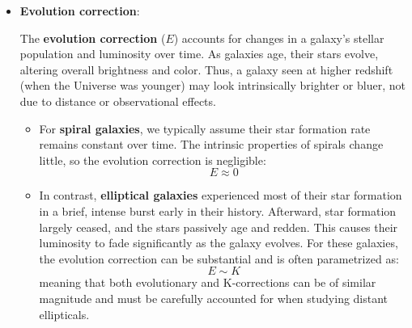 \begin{itemize}
\begin{figure}[H]
\begin{minipage}{0.42\textwidth}
        \end{minipage}%
        \hfill
        \begin{minipage}{0.58\textwidth}
            \vspace{0.5em}
        \end{minipage}
    \end{figure}

    \vspace{-1em}

    \item \textbf{Evolution correction}: 

    The \textbf{evolution correction} ($E$) accounts for changes in a galaxy's stellar population and luminosity over time. As galaxies age, their stars evolve, altering overall brightness and color. Thus, a galaxy seen at higher redshift (when the Universe was younger) may look intrinsically brighter or bluer, not due to distance or observational effects.

    \begin{itemize}
    \item For \textbf{spiral galaxies}, we typically assume their star formation rate remains constant over time. The intrinsic properties of spirals change little, so the evolution correction is negligible: 
    $$
    E \approx 0
    $$

    \item In contrast, \textbf{elliptical galaxies} experienced most of their star formation in a brief, intense burst early in their history. Afterward, star formation largely ceased, and the stars passively age and redden. This causes their luminosity to fade significantly as the galaxy evolves. For these galaxies, the evolution correction can be substantial and is often parametrized as:
    $$
    E \sim K
    $$
    meaning that both evolutionary and K-corrections can be of similar magnitude and must be carefully accounted for when studying distant ellipticals.
    \end{itemize}


\end{itemize}
